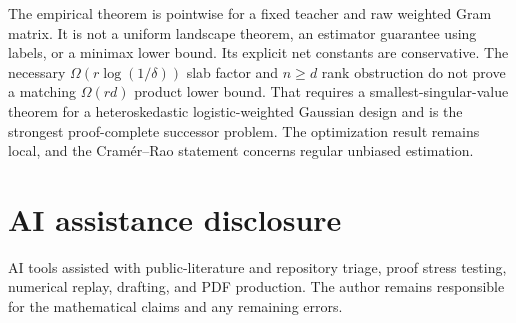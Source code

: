 \documentclass[11pt]{article}
\begin{document}
The empirical theorem is pointwise for a fixed teacher and raw weighted Gram matrix.  It is not a uniform landscape
theorem, an estimator guarantee using labels, or a minimax lower bound.  Its explicit net constants are conservative.
The necessary $\Omega(r\log(1/\delta))$ slab factor and $n\ge d$ rank obstruction do not prove a matching
$\Omega(rd)$ product lower bound.  That requires a smallest-singular-value theorem for a heteroskedastic
logistic-weighted Gaussian design and is the strongest proof-complete successor problem.  The optimization result
remains local, and the Cram\'er--Rao statement concerns regular unbiased estimation.

\section*{AI assistance disclosure}
AI tools assisted with public-literature and repository triage, proof stress testing, numerical replay, drafting, and
PDF production.  The author remains responsible for the mathematical claims and any remaining errors.
\end{document}
